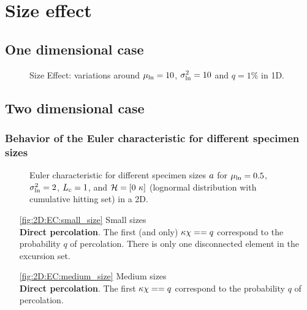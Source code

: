 \documentclass[a4paper,12pt]{article}
\begin{document}
\newpage
\section{Size effect}
\subsection{One dimensional case}
\begin{figure}[!h]
  \centering
  \hfill
   \hfill
  \caption{Size Effect: variations around $\mu_{\ln}=10$, $\sigma_{\ln}^2=10$ and $q=1\%$ in 1D.}
\end{figure}


\subsection{Two dimensional case}
\subsubsection{Behavior of the Euler characteristic for different specimen sizes}
\begin{figure}[!h]
  \centering
  \subfigure[$\Msize=0.001$\label{fig:2D:EC:small_size}]{\scalebox{0.35}{}}\hfill
  \subfigure[$\Msize=2.5$\label{fig:2D:EC:medium_size}]  {\scalebox{0.35}{}}\hfill
  \subfigure[$\Msize=8$\label{fig:2D:EC:large_size}]    {\scalebox{0.35}{}}
  \caption{Euler characteristic for different specimen sizes $a$ for $\mu_{\ln}=0.5$, $\sigma_{\ln}^2=2$, $L_c=1$, and $\mathcal{H}=[0\ \kappa]$ (lognormal distribution with cumulative hitting set) in a 2D.\label{fig:2D:EC}}
\end{figure}

\begin{itemize}
  \item [\ref{fig:2D:EC:small_size}] Small sizes \\ \textbf{Direct percolation}. The first (and only) $\kappa\chi==q$ correspond to the probability $q$ of percolation. There is only one disconnected element in the excursion set.
  \item [\ref{fig:2D:EC:medium_size}] Medium sizes \\ \textbf{Direct percolation}. The first $\kappa\chi==q$ correspond to the probability $q$ of percolation.
\end{itemize}
\end{document}
